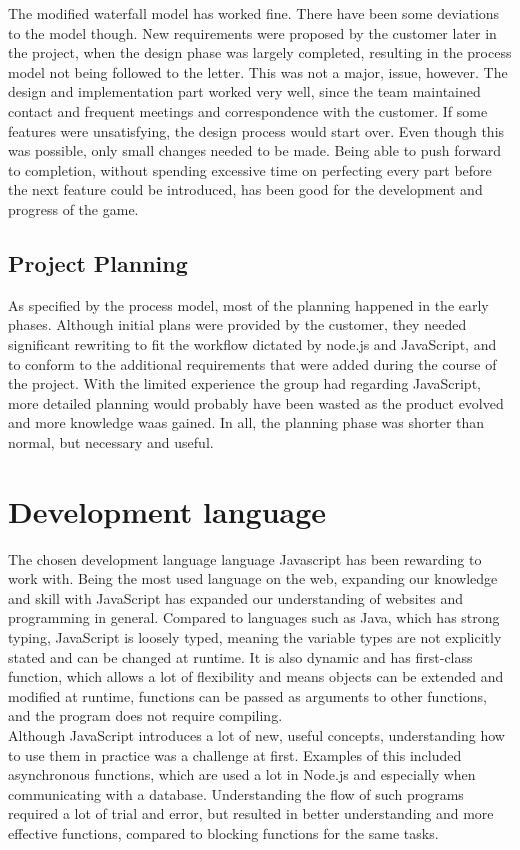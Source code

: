 The modified waterfall model has worked fine. There have been some deviations to the model though. New requirements were
proposed by the customer later in the project, when the design phase was largely completed, resulting in the process model not being followed
to the letter. This was not a major, issue, however. The design and implementation part worked very well, since the 
team maintained contact and frequent meetings and correspondence with the customer. If some features were unsatisfying, the design process would 
start over. Even though this was possible, only small changes needed to be made. Being able to push forward to completion, without spending excessive time on perfecting every part before the next feature could be introduced, has been good for the development and progress of the game. 

\subsection{Project Planning}

As specified by the process model, most of the planning happened in the early phases. Although initial plans were provided by the customer, they needed significant rewriting to fit the workflow dictated by node.js and JavaScript, and to conform to the additional requirements that were added during the course of the project. With the limited experience the group had regarding JavaScript, more detailed planning would probably have been wasted as the product evolved and more knowledge waas gained. In all, the planning phase was shorter than normal, but necessary and useful.


\section{Development language}

The chosen development language language Javascript has been rewarding to work with. Being the most used language on the web, expanding our knowledge and skill with JavaScript has expanded our understanding of websites and programming in general. Compared to languages such as Java, which has strong typing, JavaScript is loosely typed, meaning the variable types are not explicitly stated and can be changed at runtime. It is also dynamic and has first-class function, which allows a lot of flexibility and means objects can be extended and modified at runtime, functions can be passed as arguments to other functions, and the program does not require compiling.\\
\newline
Although JavaScript introduces a lot of new, useful concepts, understanding how to use them in practice was a challenge at first. Examples of this included asynchronous functions, which are used a lot in Node.js and especially when communicating with a database. Understanding the flow of such programs required a lot of trial and error, but resulted in better understanding and more effective functions, compared to blocking functions for the same tasks.\\


